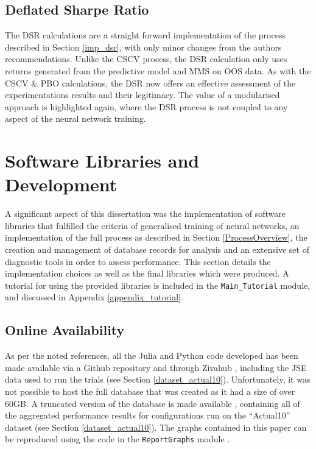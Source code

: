 \documentclass[a4paper,11pt,oneside]{article}
\theoremstyle{plain}
\theoremstyle{definition}
\begin{document}
	\subsection{Deflated Sharpe Ratio}\label{proc_dsr}
	
	The DSR calculations are a straight forward implementation of the process described in Section \ref{imp_dsr}, with only minor changes from the authors recommendations. Unlike the CSCV process, the DSR calculation only uses returns generated from the predictive model and MMS on OOS data. As with the CSCV \& PBO calculations, the DSR now offers an effective assessment of the experimentations results and their legitimacy. The value of a modularised approach is highlighted again, where the DSR process is not coupled to any aspect of the neural network training.
	
	
	
	
	
	
	
	
	
	
	
	
	
		\newpage
	\section{Software Libraries and Development}\label{Software}
	
	A significant aspect of this dissertation was the implementation of software libraries that fulfilled the criteria of generalised training of neural networks, an implementation of the full process as described in Section \ref{ProcessOverview}, the creation and management of database records for analysis and an extensive set of diagnostic tools in order to assess performance. This section details the implementation choices as well as the final libraries which were produced. A tutorial for using the provided libraries is included in the \texttt{Main\_Tutorial} module, and discussed in Appendix \ref{appendix_tutorial}.
	
	\subsection{Online Availability}\label{software_online}
	
	As per the noted references, all the Julia and Python code developed has been made available via a Github repository and through Zivahub \citep{DCCodeBase}, including the JSE data used to run the trials (see Section \ref{dataset_actual10}). Unfortunately, it was not possible to host the full database that was created as it had a size of over 60GB. A truncated version of the database is made available \citep{DCAggregatedDatabase}, containing all of the aggregated performance results for configurations run on the ``Actual10'' dataset (see Section \ref{dataset_actual10}). The graphs contained in this paper can be reproduced using the code in the \texttt{ReportGraphs} module \citep{DCReportGraphs}.
	
\end{document}
